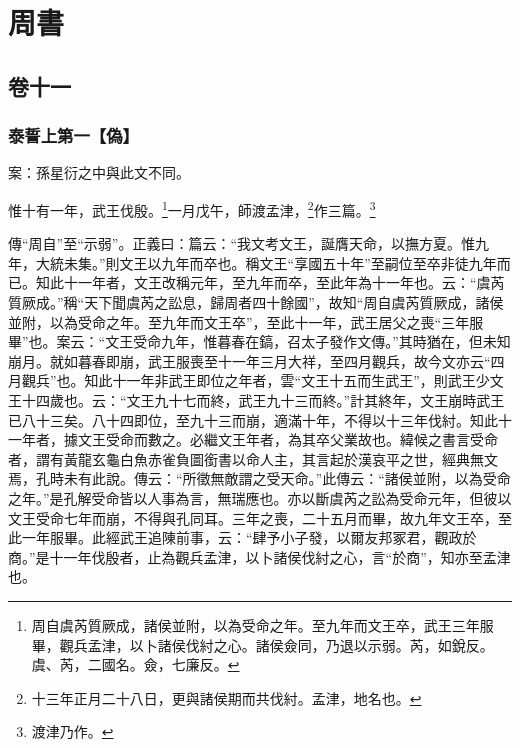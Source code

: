 


\part{周書}


\chapter{卷十一}


\section{泰誓上第一【偽】}

 {\noindent\zhuan{}\fzbyks 案：孫星衍之中與此文不同。 \par}

惟十有一年，武王伐殷。\footnote{周自虞芮質厥成，諸侯並附，以為受命之年。至九年而文王卒，武王三年服畢，觀兵孟津，以卜諸侯伐紂之心。諸侯僉同，乃退以示弱。芮，如銳反。虞、芮，二國名。僉，七廉反。}一月戊午，師渡孟津，\footnote{十三年正月二十八日，更與諸侯期而共伐紂。孟津，地名也。}作三篇。\footnote{渡津乃作。}


{\noindent\zhuan{}\fzbyks 傳“周自”至“示弱”。正義曰：篇云：“我文考文王，誕膺天命，以撫方夏。惟九年，大統未集。”則文王以九年而卒也。稱文王“享國五十年”至嗣位至卒非徒九年而已。知此十一年者，文王改稱元年，至九年而卒，至此年為十一年也。云：“虞芮質厥成。”稱“天下聞虞芮之訟息，歸周者四十餘國”，故知“周自虞芮質厥成，諸侯並附，以為受命之年。至九年而文王卒”，至此十一年，武王居父之喪“三年服畢”也。案云：“文王受命九年，惟暮春在鎬，召太子發作文傳。”其時猶在，但未知崩月。就如暮春即崩，武王服喪至十一年三月大祥，至四月觀兵，故今文亦云“四月觀兵”也。知此十一年非武王即位之年者，雲“文王十五而生武王”，則武王少文王十四歲也。云：“文王九十七而終，武王九十三而終。”計其終年，文王崩時武王已八十三矣。八十四即位，至九十三而崩，適滿十年，不得以十三年伐紂。知此十一年者，據文王受命而數之。必繼文王年者，為其卒父業故也。緯候之書言受命者，謂有黃龍玄龜白魚赤雀負圖銜書以命人主，其言起於漢哀平之世，經典無文焉，孔時未有此說。傳云：“所徵無敵謂之受天命。”此傳云：“諸侯並附，以為受命之年。”是孔解受命皆以人事為言，無瑞應也。亦以斷虞芮之訟為受命元年，但彼以文王受命七年而崩，不得與孔同耳。三年之喪，二十五月而畢，故九年文王卒，至此一年服畢。此經武王追陳前事，云：“肆予小子發，以爾友邦冢君，觀政於商。”是十一年伐殷者，止為觀兵孟津，以卜諸侯伐紂之心，言“於商”，知亦至孟津也。 \par}

